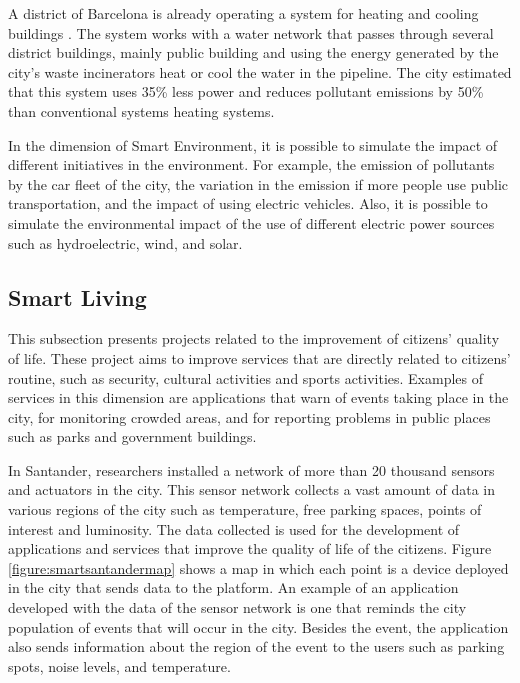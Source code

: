 A district of Barcelona is already operating a system for heating and cooling buildings \citep{hug2016barcelona}. The system works with a water network that passes through several district buildings, mainly public building and using the energy generated by the city's waste incinerators heat or cool the water in the pipeline. The city estimated that this system uses 35\% less power and reduces pollutant emissions by 50\% than conventional systems heating systems.

In the dimension of Smart Environment, it is possible to simulate the impact of different initiatives in the environment. For example, the emission of pollutants by the car fleet of the city, the variation in the emission if more people use public transportation, and the impact of using electric vehicles. Also, it is possible to simulate the environmental impact of the use of different electric power sources such as hydroelectric, wind, and solar. 

\subsection{Smart Living}

This subsection presents projects related to the improvement of citizens' quality of life. These project aims to improve services that are directly related to citizens' routine, such as security, cultural activities and sports activities. Examples of services in this dimension are applications that warn of events taking place in the city, for monitoring crowded areas, and for reporting problems in public places such as parks and government buildings.

In Santander, researchers installed a network of more than 20 thousand sensors and actuators in the city. This sensor network collects a vast amount of data in various regions of the city such as temperature, free parking spaces, points of interest and luminosity. The data collected is used for the development of applications and services that improve the quality of life of the citizens. Figure \ref{figure:smartsantandermap} shows a map in which each point is a device deployed in the city that sends data to the platform. An example of an application developed with the data of the sensor network is one that reminds the city population of events that will occur in the city. Besides the event, the application also sends information about the region of the event to the users such as parking spots, noise levels, and temperature.

